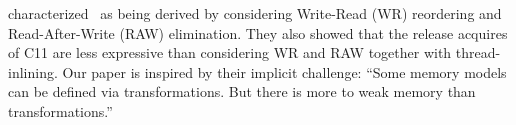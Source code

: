 \citet{DBLP:conf/fm/LahavV16} characterized \tso\ as being derived by
considering Write-Read (\textsf{WR}) reordering and Read-After-Write
(\textsf{RAW}) elimination.  They also showed that the release acquires of
C11 are less expressive than considering \textsf{WR} and \textsf{RAW}
together with thread-inlining.  Our paper is inspired by their implicit
challenge: ``Some memory models can be defined via transformations.  But
there is more to weak memory than transformations.''


